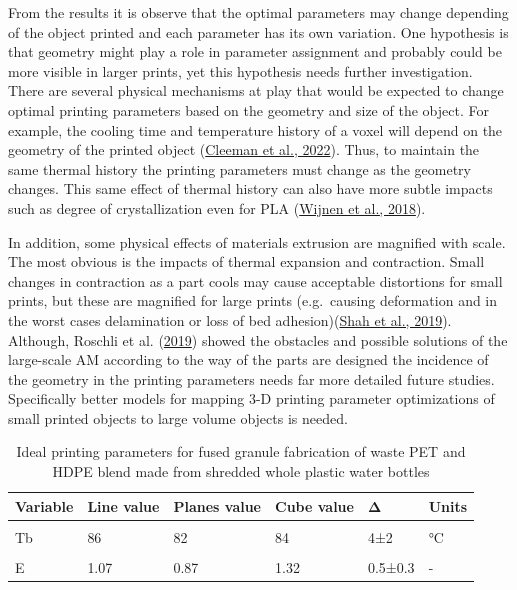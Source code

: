 \documentclass[
  12pt,
]{article}
\begin{document}
From the results it is observe that the optimal parameters may change
depending of the object printed and each parameter has its own
variation. One hypothesis is that geometry might play a role in
parameter assignment and probably could be more visible in larger
prints, yet this hypothesis needs further investigation. There are
several physical mechanisms at play that would be expected to change
optimal printing parameters based on the geometry and size of the
object. For example, the cooling time and temperature history of a voxel
will depend on the geometry of the printed object
(\protect\hyperlink{ref-cleeman2022}{Cleeman et al., 2022}). Thus, to
maintain the same thermal history the printing parameters must change as
the geometry changes. This same effect of thermal history can also have
more subtle impacts such as degree of crystallization even for PLA
(\protect\hyperlink{ref-wijnen2018}{Wijnen et al., 2018}).

In addition, some physical effects of materials extrusion are magnified
with scale. The most obvious is the impacts of thermal expansion and
contraction. Small changes in contraction as a part cools may cause
acceptable distortions for small prints, but these are magnified for
large prints (e.g.~causing deformation and in the worst cases
delamination or loss of bed
adhesion)(\protect\hyperlink{ref-shah2019}{Shah et al., 2019}).
Although, Roschli et al. (\protect\hyperlink{ref-roschli2019}{2019})
showed the obstacles and possible solutions of the large-scale AM
according to the way of the parts are designed the incidence of the
geometry in the printing parameters needs far more detailed future
studies. Specifically better models for mapping 3-D printing parameter
optimizations of small printed objects to large volume objects is
needed.

\hypertarget{tbl-table3}{}
\begin{table}
\caption{\label{tbl-table3}Ideal printing parameters for fused granule fabrication of waste PET and
HDPE blend made from shredded whole plastic water bottles }\tabularnewline

\centering\begingroup\fontsize{10}{12}\selectfont

\begin{tabular}[t]{llllll}
\toprule
Variable & Line value & Planes value & Cube value & Δ & Units\\
\midrule
\cellcolor{gray!6}{T1} & \cellcolor{gray!6}{258} & \cellcolor{gray!6}{263} & \cellcolor{gray!6}{264} & \cellcolor{gray!6}{6 ±3.2} & \cellcolor{gray!6}{°C}\\
Tb & 86 & 82 & 84 & 4±2 & °C\\
\cellcolor{gray!6}{Ps} & \cellcolor{gray!6}{21} & \cellcolor{gray!6}{14} & \cellcolor{gray!6}{10} & \cellcolor{gray!6}{11±5.6} & \cellcolor{gray!6}{mm/s}\\
E & 1.07 & 0.87 & 1.32 & 0.5±0.3 & -\\
\bottomrule
\end{tabular}
\endgroup{}
\end{table}
\end{document}
